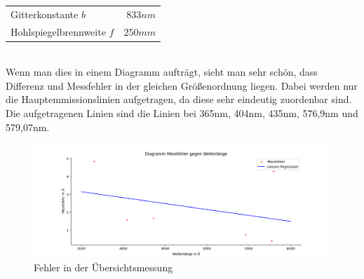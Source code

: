 \newline
\begin{tabular}[h]{l r}
    Gitterkonstante $b$ & $833 nm$\\
    Hohlspiegelbrennweite $f$ & $250mm$\\
\end{tabular}
\\
\newline
Wenn man dies in einem Diagramm aufträgt, sieht man sehr schön, dass Differenz und Messfehler in der gleichen Größenordnung liegen. Dabei werden nur die Hauptemmissionslinien 
aufgetragen, da diese sehr eindeutig zuordenbar sind. Die aufgetragenen Linien sind die Linien bei 365nm, 404nm, 435nm, 576,9nm und 579,07nm.
\begin{figure}[h]
    \centering
    \includegraphics[width =\linewidth]{Bilder/linregress.png}
    \caption{Fehler in der Übersichtsmessung}
    \label{FehlUeb}
\end{figure}
